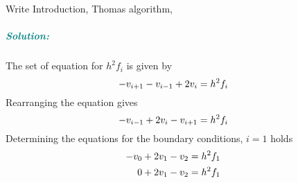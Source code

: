 \documentclass[%
oneside,                 %
final,                   %
10pt]{article}
\begin{document}
Write Introduction, Thomas algorithm, 




\subparagraph{\textcolor{teal}{Solution:}}
The set of equation for $h^2f_i$ is given by
\begin{equation*}
   -v_{i+1}-v_{i-1}+2v_i = h^2f_i  \hspace{0.5cm} 
\end{equation*}
Rearranging the equation gives
\begin{equation*}
  -v_{i-1}+2v_i - v_{i+1}= h^2f_i  \hspace{0.5cm} 
\end{equation*}
Determining the equations for the boundary conditions, $i=1$ holds 
\begin{equation*}
\begin{aligned}
  -v_{0}+2v_1 - v_{2}&= h^2f_1  \hspace{0.5cm} \\
  0 + 2v_1 - v_{2}&= h^2f_1  \hspace{0.5cm} 
\end{aligned}
\end{equation*}
\end{document}
